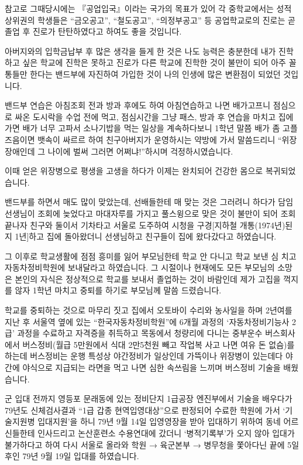 \documentclass[chapter,book,openany,twoside]{oblivoir}
\begin{document}
참고로 그때당시에는 『공업입국』이라는 국가의 목표가 있어 각 중학교에서는 성적 상위권의 학생들은 ``금오공고'', ``철도공고'', ``의정부공고'' 등 공업학교로의 진로는 곧 졸업 후 진로가 탄탄하였다고 하여도 좋을 것입니다.

아버지와의 입학금납부 후 많은 생각을 들게 한 것은 나도 능력은 충분한데 내가 진학하고 싶은 학교에 진학은 못하고 진로가 다른 학교에 진학한 것이 불만이 되어 아주 꼴통들만 한다는 밴드부에 자진하여 가입한 것이 나의 인생에 많은 변환점이 되었던 것입니다.

밴드부 연습은 아침조회 전과 방과 후에도 하여 아침연습하고 나면 배가고프니 점심으로 싸온 도시락을 수업 전에 먹고, 점심시간을 그냥 패스, 방과 후 연습을 마치고 집에 가면 배가 너무 고파서 소나기밥을 먹는 일상을 계속하다보니 1학년 말쯤 배가 좀 고플 즈음이면 뱃속이 싸르르 하여 친구아버지가 운영하시는 약방에 가서 말씀드리니 ``위장장애인데 그 나이에 벌써 그러면 어쩌냐!''하시며 걱정하시였습니다.

이때 얻은 위장병으로 평생을 고생을 하다가 이제는 완치되어 건강한 몸으로 복귀되었습니다.

밴드부를 하면서 매도 많이 맞았는데, 선배들한테 매 맞는 것은 그러려니 하다가 담임선생님이 조회에 늦었다고 마대자루를 가지고 풀스윙으로 맞은 것이 불만이 되어 조회 끝나자 친구와 둘이서 기차타고 서울로 도주하여 시청을 구경[지하철 개통(1974년)된 지 1년]하고 집에 돌아왔더니 선생님하고 친구들이 집에 왔다갔다고 하였습니다.

그 이후로 학교생활에 점점 흥미를 잃어 부모님한테 학교 안 다니고 학교 보낸 심 치고 자동차정비학원에 보내달라고 하였습니다. 그 시절이나 현재에도 모든 부모님의 소망은 본인의 자식은 정상적으로 학교를 보내서 졸업하는 것이 바람인데 제가 고집을 꺽지를 않자 1학년 마치고 중퇴를 하기로 부모님께 말씀 드렸습니다.

학교를 중퇴하는 것으로 마무리 짓고 집에서 오토바이 수리와 농사일을 하며 2년여를 지난 후 서울역 옆에 있는 ``한국자동차정비학원''에 6개월 과정의 `자동차정비기능사 2급' 과정을 수료하고 자격증을 취득하고 목동에서 청량리에 다니는 중부운수 버스회사에서 버스정비(월급 5만원에서 식대 2만5천원 빼고 작업복 사고 나면 여유 돈 없슴)를 하는데 버스정비는 운행 특성상 야간정비가 일상인데 가뜩이나 위장병이 있는데다 야간에 야식으로 지급되는 라면을 먹고 나면 심한 속쓰림을 느끼며 버스정비 기술을 배웠습니다.

군 입대 전까지 영등포 문래동에 있는 정비단지 1급공장 엔진부에서 기술을 배우다가 79년도 신체검사결과 ``1급 갑종 현역입영대상''으로 판정되어 수료한 학원에 가서 `기술지원병 입대지원'을 하니 79년 9월 14일 입영영장을 받아 입대하기 위하여 동네 어르신들한테 인사드리고 논산훈련소 수용연대에 갔더니 `병적기록부'가 오지 않아 입대가 불가하다고 하여 다시 서울로 올라와 학원 → 육군본부 → 병무청을 쫓아다닌 끝에 5일 후인 79년 9월 19일 입대를 하였습니다.
\end{document}

